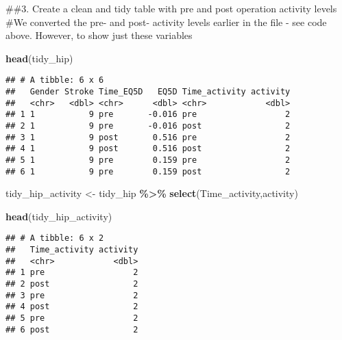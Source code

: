 \documentclass[
]{article}
\newenvironment{Shaded}{\begin{snugshade}}{\end{snugshade}}
\newcommand{\FunctionTok}[1]{\textcolor[rgb]{0.13,0.29,0.53}{\textbf{#1}}}
\newcommand{\NormalTok}[1]{#1}
\newcommand{\OtherTok}[1]{\textcolor[rgb]{0.56,0.35,0.01}{#1}}
\newcommand{\SpecialCharTok}[1]{\textcolor[rgb]{0.81,0.36,0.00}{\textbf{#1}}}
\begin{document}
\#\#3. Create a clean and tidy table with pre and post operation
activity levels \#We converted the pre- and post- activity levels
earlier in the file - see code above. However, to show just these
variables

\begin{Shaded}
\begin{Highlighting}[]
\FunctionTok{head}\NormalTok{(tidy\_hip)}
\end{Highlighting}
\end{Shaded}

\begin{verbatim}
## # A tibble: 6 x 6
##   Gender Stroke Time_EQ5D   EQ5D Time_activity activity
##   <chr>   <dbl> <chr>      <dbl> <chr>            <dbl>
## 1 1           9 pre       -0.016 pre                  2
## 2 1           9 pre       -0.016 post                 2
## 3 1           9 post       0.516 pre                  2
## 4 1           9 post       0.516 post                 2
## 5 1           9 pre        0.159 pre                  2
## 6 1           9 pre        0.159 post                 2
\end{verbatim}

\begin{Shaded}
\begin{Highlighting}[]
\NormalTok{tidy\_hip\_activity }\OtherTok{\textless{}{-}}\NormalTok{ tidy\_hip }\SpecialCharTok{\%\textgreater{}\%} 
  \FunctionTok{select}\NormalTok{(Time\_activity,activity) }

\FunctionTok{head}\NormalTok{(tidy\_hip\_activity)}
\end{Highlighting}
\end{Shaded}

\begin{verbatim}
## # A tibble: 6 x 2
##   Time_activity activity
##   <chr>            <dbl>
## 1 pre                  2
## 2 post                 2
## 3 pre                  2
## 4 post                 2
## 5 pre                  2
## 6 post                 2
\end{verbatim}
\end{document}
